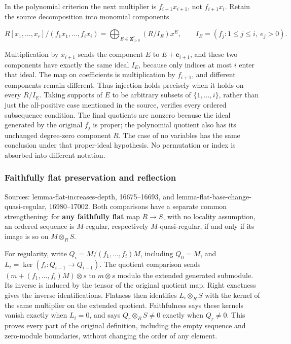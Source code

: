 In the polynomial criterion the next multiplier is \(f_{i+1}x_{i+1}\), not \(f_{i+1}x_i\). Retain the source decomposition into monomial components

\[
R[x_1,\ldots,x_r]/(f_1x_1,\ldots,f_ix_i)
=\bigoplus_{E\in\mathbf Z_{\geq0}^r}(R/I_E)x^E,
\qquad I_E=(f_j:1\leq j\leq i,\ e_j>0).
\]

Multiplication by \(x_{i+1}\) sends the component \(E\) to \(E+\mathbf e_{i+1}\), and these two components have exactly the same ideal \(I_E\), because only indices at most \(i\) enter that ideal. The map on coefficients is multiplication by \(f_{i+1}\), and different components remain different. Thus injection holds precisely when it holds on every \(R/I_E\). Taking supports of \(E\) to be arbitrary subsets of \(\{1,\ldots,i\}\), rather than just the all-positive case mentioned in the source, verifies every ordered subsequence condition. The final quotients are nonzero because the ideal generated by the original \(f_j\) is proper; the polynomial quotient also has its unchanged degree-zero component \(R\). The case of no variables has the same conclusion under that proper-ideal hypothesis. No permutation or index is absorbed into different notation.

\subsubsection{Faithfully flat preservation and reflection}\label{faithfully-flat-preservation-and-reflection}

Sources: lemma-flat-increases-depth, 16675--16693, and lemma-flat-base-change-quasi-regular, 16980--17002. Both comparisons have a separate common strengthening: for \textbf{any faithfully flat} map \(R\to S\), with no locality assumption, an ordered sequence is \(M\)-regular, respectively \(M\)-quasi-regular, if and only if its image is so on \(M\otimes_RS\).

For regularity, write \(Q_i=M/(f_1,\ldots,f_i)M\), including \(Q_0=M\), and \(L_i=\ker(f_i:Q_{i-1}\to Q_{i-1})\). The quotient comparison sends \((m+(f_1,\ldots,f_i)M)\otimes s\) to \(m\otimes s\) modulo the extended generated submodule. Its inverse is induced by the tensor of the original quotient map. Right exactness gives the inverse identifications. Flatness then identifies \(L_i\otimes_RS\) with the kernel of the same multiplier on the extended quotient. Faithfulness says these kernels vanish exactly when \(L_i=0\), and says \(Q_r\otimes_RS\ne0\) exactly when \(Q_r\ne0\). This proves every part of the original definition, including the empty sequence and zero-module boundaries, without changing the order of any element.

